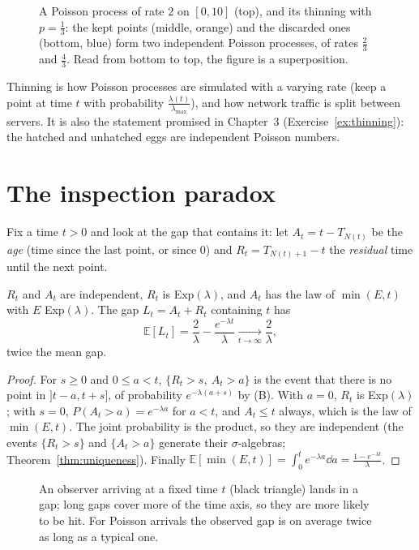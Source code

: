 \begin{figure}[ht]
\centering
{}
\caption{A Poisson process of rate $2$ on $[0,10]$ (top), and its thinning with $p=\frac13$: the kept points (middle, orange) and the
discarded ones (bottom, blue) form two independent Poisson processes, of rates $\frac23$ and $\frac43$. Read from bottom to top, the
figure is a superposition.}
\label{fig:thinning}
\end{figure}

Thinning is how Poisson processes are simulated with a varying rate (keep a point at time $t$ with probability $\frac{\lambda(t)}{\lambda_{\max}}$),
and how network traffic is split between servers. It is also the statement promised in Chapter~3 (Exercise~\ref{ex:thinning}): the
hatched and unhatched eggs are independent Poisson numbers.

\section{The inspection paradox}

Fix a time $t>0$ and look at the gap that contains it: let $A_t=t-T_{N(t)}$ be the \emph{age} (time since the last point, or since $0$) and
$R_t=T_{N(t)+1}-t$ the \emph{residual} time until the next point.

\begin{proposition}\label{prop:inspection}
$R_t$ and $A_t$ are independent, $R_t$ is Exp$(\lambda)$, and $A_t$ has the law of $\min(E,t)$ with $E$ Exp$(\lambda)$. The gap $L_t=A_t+R_t$ containing $t$ has
\[
\mathbb E[L_t]=\frac2\lambda-\frac{e^{-\lambda t}}\lambda\xrightarrow[t\to\infty]{}\frac2\lambda,
\]
twice the mean gap.
\end{proposition}
\begin{proof}
For $s\ge0$ and $0\le a<t$, $\{R_t>s,\ A_t>a\}$ is the event that there is no point in $]t-a,t+s]$, of probability $e^{-\lambda(a+s)}$ by (B). With $a=0$, $R_t$ is
Exp$(\lambda)$; with $s=0$, $P(A_t>a)=e^{-\lambda a}$ for $a<t$, and $A_t\le t$ always, which is the law of $\min(E,t)$. The joint probability is the product, so they
are independent (the events $\{R_t>s\}$ and $\{A_t>a\}$ generate their $\sigma$-algebras; Theorem~\ref{thm:uniqueness}). Finally
$\mathbb E[\min(E,t)]=\int_0^te^{-\lambda a}\dd a=\frac{1-e^{-\lambda t}}\lambda$.
\end{proof}

\begin{figure}[ht]
\centering
{}
\caption{An observer arriving at a fixed time $t$ (black triangle) lands in a gap; long gaps cover more of the time axis, so they
are more likely to be hit. For Poisson arrivals the observed gap is on average twice as long as a typical one.}
\label{fig:inspection}
\end{figure}

